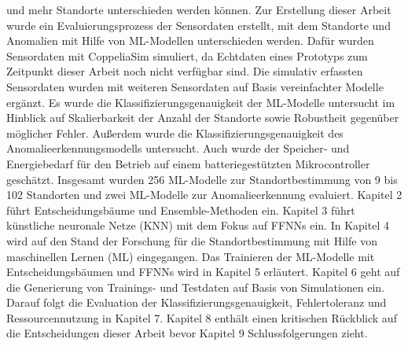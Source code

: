 und mehr Standorte unterschieden werden können.
\newline
\newline
Zur Erstellung dieser Arbeit wurde ein Evaluierungsprozess der Sensordaten erstellt, mit dem Standorte und Anomalien mit Hilfe von ML-Modellen unterschieden werden.
Dafür wurden Sensordaten mit CoppeliaSim simuliert, da Echtdaten eines Prototyps zum Zeitpunkt dieser Arbeit noch nicht verfügbar sind.
Die simulativ erfassten Sensordaten wurden mit weiteren Sensordaten auf Basis vereinfachter Modelle ergänzt.
Es wurde die Klassifizierungsgenauigkeit der ML-Modelle untersucht im Hinblick auf Skalierbarkeit der Anzahl der Standorte sowie Robustheit gegenüber möglicher Fehler.
Außerdem wurde die Klassifizierungsgenauigkeit des Anomalieerkennungsmodells untersucht.
Auch wurde der Speicher- und Energiebedarf für den Betrieb auf einem batteriegestützten Mikrocontroller geschätzt.
Insgesamt wurden 256 ML-Modelle zur Standortbestimmung von 9 bis 102 Standorten und zwei ML-Modelle zur Anomalieerkennung evaluiert.
\newline
\newline
Kapitel 2 führt Entscheidungsbäume und Ensemble-Methoden ein.
Kapitel 3 führt künstliche neuronale Netze (KNN) mit dem Fokus auf FFNNs ein.
In Kapitel 4 wird auf den Stand der Forschung für die Standortbestimmung mit Hilfe von maschinellen Lernen (ML) eingegangen.
Das Trainieren der ML-Modelle mit Entscheidungsbäumen und FFNNs wird in Kapitel 5 erläutert.
Kapitel 6 geht auf die Generierung von Trainings- und Testdaten auf Basis von Simulationen ein.
Darauf folgt die Evaluation der Klassifizierungsgenauigkeit, Fehlertoleranz und Ressourcennutzung in Kapitel 7.
Kapitel 8 enthält einen kritischen Rückblick auf die Entscheidungen dieser Arbeit bevor Kapitel 9 Schlussfolgerungen zieht.